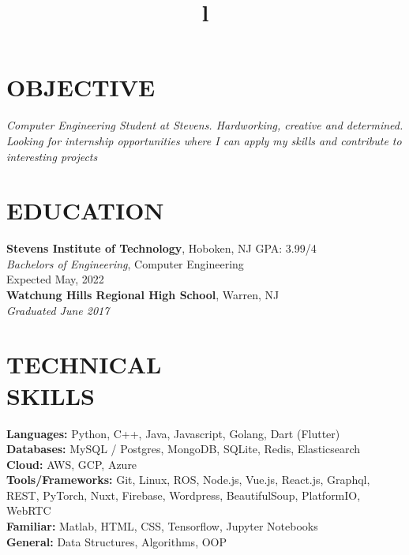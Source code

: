 \documentclass[margin]{res}
\begin{document}
\begin{resume}

\section{OBJECTIVE}
{\sl Computer Engineering Student at Stevens. Hardworking, creative and determined. Looking for internship opportunities where I can apply my skills and contribute to interesting projects }

\section{EDUCATION}
\textbf{Stevens Institute of Technology}, Hoboken, NJ \hfill GPA: 3.99/4\\
{\sl Bachelors of Engineering}, Computer Engineering\\
Expected May, 2022 \\
\textbf{Watchung Hills Regional High School}, Warren, NJ\\
{\sl Graduated June 2017}

\section{TECHNICAL\\SKILLS}

\textbf{Languages: } Python, C++, Java, Javascript, Golang, Dart (Flutter)
\\
\textbf{Databases: } MySQL / Postgres, MongoDB, SQLite, Redis, Elasticsearch
\\
\textbf{Cloud: } AWS, GCP, Azure
\\
\textbf{Tools/Frameworks: } Git, Linux, ROS, Node.js, Vue.js, React.js, Graphql, REST,
PyTorch, Nuxt, Firebase, Wordpress, BeautifulSoup, PlatformIO, WebRTC
\\
\textbf{Familiar: } Matlab, HTML, CSS, Tensorflow, Jupyter Notebooks
\\
\textbf{General: } Data Structures, Algorithms, OOP

\begin{format}
\title{l}\\
\\
\body\\
\end{format}


\end{resume}
\end{document}
